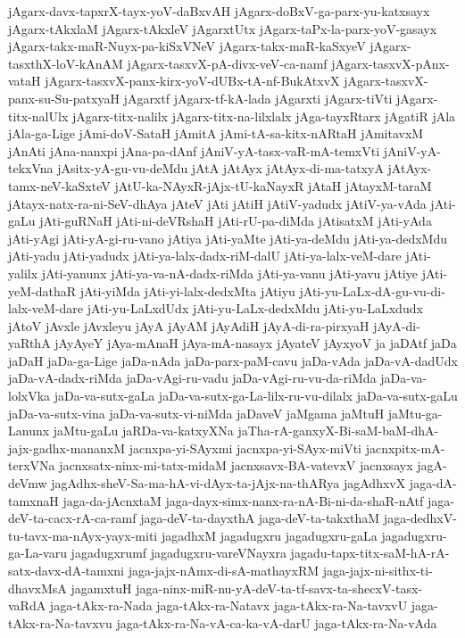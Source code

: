 {jAgarx-davx-tapxrX-tayx-yoV-daBxvAH
jAgarx-doBxV-ga-parx-yu-katxsayx
jAgarx-tAkxlaM
jAgarx-tAkxleV
jAgarxtUtx
jAgarx-taPx-la-parx-yoV-gasayx
jAgarx-takx-maR-Nuyx-pa-kiSxVNeV
jAgarx-takx-maR-kaSxyeV
jAgarx-tasxthX-loV-kAnAM
jAgarx-tasxvX-pA-divx-veV-ca-namf
jAgarx-tasxvX-pAnx-vataH
jAgarx-tasxvX-panx-kirx-yoV-dUBx-tA-nf-BukAtxvX
jAgarx-tasxvX-panx-su-Su-patxyaH
jAgarxtf
jAgarx-tf-kA-lada
jAgarxti
jAgarx-tiVti
jAgarx-titx-nalUlx
jAgarx-titx-nalilx
jAgarx-titx-na-lilxlalx
jAga-tayxRtarx
jAgatiR
jAla
jAla-ga-Lige
jAmi-doV-SataH
jAmitA
jAmi-tA-sa-kitx-nARtaH
jAmitavxM
jAnAti
jAna-nanxpi
jAna-pa-dAnf
jAniV-yA-tasx-vaR-mA-temxVti
jAniV-yA-tekxVna
jAsitx-yA-gu-vu-deMdu
jAtA
jAtAyx
jAtAyx-di-ma-tatxyA
jAtAyx-tamx-neV-kaSxteV
jAtU-ka-NAyxR-jAjx-tU-kaNayxR
jAtaH
jAtayxM-taraM
jAtayx-natx-ra-ni-SeV-dhAya
jAteV
jAti
jAtiH
jAtiV-yadudx
jAtiV-ya-vAda
jAti-gaLu
jAti-guRNaH
jAti-ni-deVRshaH
jAti-rU-pa-diMda
jAtisatxM
jAti-yAda
jAti-yAgi
jAti-yA-gi-ru-vano
jAtiya
jAti-yaMte
jAti-ya-deMdu
jAti-ya-dedxMdu
jAti-yadu
jAti-yadudx
jAti-ya-lalx-dadx-riM-dalU
jAti-ya-lalx-veM-dare
jAti-yalilx
jAti-yanunx
jAti-ya-va-nA-dadx-riMda
jAti-ya-vanu
jAti-yavu
jAtiye
jAti-yeM-dathaR
jAti-yiMda
jAti-yi-lalx-dedxMta
jAtiyu
jAti-yu-LaLx-dA-gu-vu-di-lalx-veM-dare
jAti-yu-LaLxdUdx
jAti-yu-LaLx-dedxMdu
jAti-yu-LaLxdudx
jAtoV
jAvxle
jAvxleyu
jAyA
jAyAM
jAyAdiH
jAyA-di-ra-pirxyaH
jAyA-di-yaRthA
jAyAyeY
jAya-mAnaH
jAya-mA-nasayx
jAyateV
jAyxyoV
ja
jaDAtf
jaDa
jaDaH
jaDa-ga-Lige
jaDa-nAda
jaDa-parx-paM-cavu
jaDa-vAda
jaDa-vA-dadUdx
jaDa-vA-dadx-riMda
jaDa-vAgi-ru-vadu
jaDa-vAgi-ru-vu-da-riMda
jaDa-va-lolxVka
jaDa-va-sutx-gaLa
jaDa-va-sutx-ga-La-lilx-ru-vu-dilalx
jaDa-va-sutx-gaLu
jaDa-va-sutx-vina
jaDa-va-sutx-vi-niMda
jaDaveV
jaMgama
jaMtuH
jaMtu-ga-Lanunx
jaMtu-gaLu
jaRDa-va-katxyXNa
jaTha-rA-ganxyX-Bi-saM-baM-dhA-jajx-gadhx-mananxM
jacnxpa-yi-SAyxmi
jacnxpa-yi-SAyx-miVti
jacnxpitx-mA-terxVNa
jacnxsatx-ninx-mi-tatx-midaM
jacnxsavx-BA-vatevxV
jacnxsayx
jagA-deVmw
jagAdhx-sheV-Sa-ma-hA-vi-dAyx-ta-jAjx-na-thARya
jagAdhxvX
jaga-dA-tamxnaH
jaga-da-jAcnxtaM
jaga-dayx-simx-nanx-ra-nA-Bi-ni-da-shaR-nAtf
jaga-deV-ta-cacx-rA-ca-ramf
jaga-deV-ta-dayxthA
jaga-deV-ta-takxthaM
jaga-dedhxV-tu-tavx-ma-nAyx-yayx-miti
jagadhxM
jagadugxru
jagadugxru-gaLa
jagadugxru-ga-La-varu
jagadugxrumf
jagadugxru-vareVNayxra
jagadu-tapx-titx-saM-hA-rA-satx-davx-dA-tamxni
jaga-jajx-nAmx-di-sA-mathayxRM
jaga-jajx-ni-sithx-ti-dhavxMsA
jagamxtuH
jaga-ninx-miR-nu-yA-deV-ta-tf-savx-ta-shecxV-tasx-vaRdA
jaga-tAkx-ra-Nada
jaga-tAkx-ra-Natavx
jaga-tAkx-ra-Na-tavxvU
jaga-tAkx-ra-Na-tavxvu
jaga-tAkx-ra-Na-vA-ca-ka-vA-darU
jaga-tAkx-ra-Na-vAda
}
